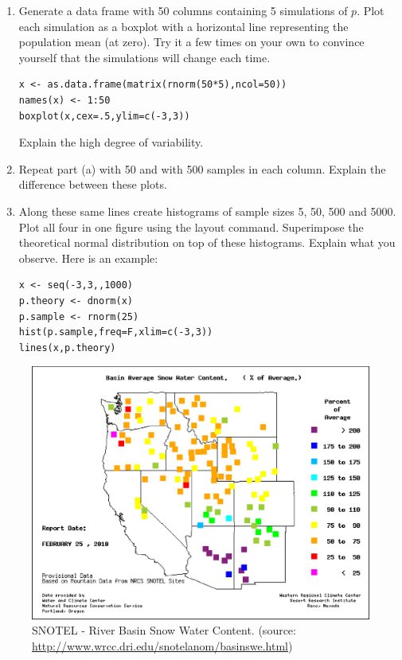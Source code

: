 \documentclass[11pt]{article}
\begin{document}
\begin{enumerate}
\begin{enumerate}
\item Generate a data frame with 50 columns containing 5 simulations of $p$. Plot each simulation as a boxplot with a horizontal line representing the population mean (at zero). Try it a few times on your own to convince yourself that the simulations will change each time. 
\begin{verbatim}
x <- as.data.frame(matrix(rnorm(50*5),ncol=50))
names(x) <- 1:50
boxplot(x,cex=.5,ylim=c(-3,3))
\end{verbatim}

Explain the high degree of variability.
\item Repeat part (a) with 50 and with 500 samples in each column.  Explain the difference between these plots. 
\item Along these same lines create histograms of sample sizes 5, 50, 500 and 5000. Plot all four in one figure using the layout command.  Superimpose the theoretical normal distribution on top of these histograms. Explain what you observe.  Here is an example:

\begin{verbatim}
x <- seq(-3,3,,1000)
p.theory <- dnorm(x)
p.sample <- rnorm(25)
hist(p.sample,freq=F,xlim=c(-3,3))
lines(x,p.theory)
\end{verbatim}


\end{enumerate}
\end{enumerate}

\begin{figure}[htbp] %
   \centering
   \includegraphics[width=\textwidth]{snotswe.eps} 
   \caption{SNOTEL - River Basin Snow Water Content. (source: \url{http://www.wrcc.dri.edu/snotelanom/basinswe.html})}
\end{figure}
\end{document}
